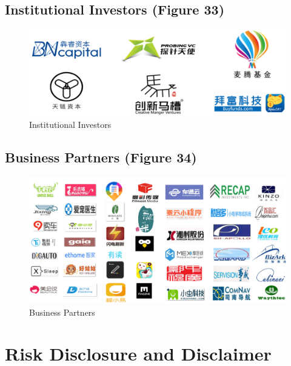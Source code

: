 \documentclass[fleqn,10pt]{SelfArx} %
\begin{document}
\subsection{Institutional Investors (Figure 33)}

\begin{figure}[!ht]\centering %
\includegraphics[width=\linewidth]{34}
\caption{Institutional Investors}
\label{fig:36}
\end{figure}

\subsection{Business Partners (Figure 34)}

\begin{figure}[!ht]\centering %
\includegraphics[width=\linewidth]{35}
\caption{Business Partners}
\label{fig:35}
\end{figure}

\cleardoublepage
\newpage
\cleardoublepage

\section{Risk Disclosure and Disclaimer}
\end{document}
